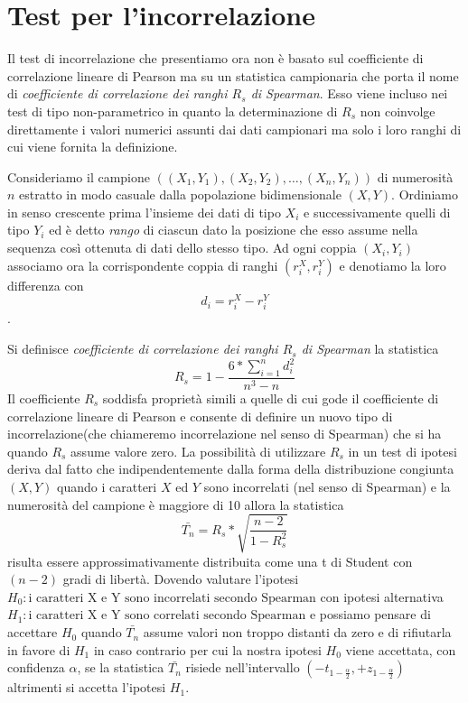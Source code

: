 \section{Test per l'incorrelazione}
Il test di incorrelazione che presentiamo ora non è basato sul coefficiente di correlazione lineare di Pearson 
ma su un statistica campionaria che porta il nome di \emph{coefficiente di correlazione dei ranghi $R_s$ di Spearman}.\newline
Esso viene incluso nei test di tipo non-parametrico in quanto la determinazione di $R_s$ non coinvolge direttamente
i valori numerici assunti dai dati campionari ma solo i loro ranghi di cui viene fornita la definizione.

Consideriamo il campione $((X_1, Y_1), (X_2, Y_2), \dots, (X_n, Y_n))$ di numerosità $n$ estratto in modo casuale
dalla popolazione bidimensionale $(X,Y)$.\newline
Ordiniamo in senso crescente prima l'insieme dei dati di tipo $X_i$ e successivamente quelli di tipo $Y_i$ ed è detto
\emph{rango} di ciascun dato la posizione che esso assume nella sequenza così ottenuta di dati dello stesso tipo.\newline
Ad ogni coppia $(X_i, Y_i)$ associamo ora la corrispondente coppia di ranghi $(r_i^X, r_i^Y)$ e denotiamo la loro differenza con
\[ d_i = r_i^X - r_i^Y \].

Si definisce \emph{coefficiente di correlazione dei ranghi $R_s$ di Spearman} la statistica 
\[ R_s = 1 - \frac{6 * \sum _{i = 1}^n d_i^2}{n^3 - n} \]
Il coefficiente $R_s$ soddisfa proprietà simili a quelle di cui gode il coefficiente di correlazione lineare di Pearson
e consente di definire un nuovo tipo di incorrelazione(che chiameremo incorrelazione nel senso di Spearman) 
che si ha quando $R_s$ assume valore zero.\newline
La possibilità di utilizzare $R_s$ in un test di ipotesi deriva dal fatto che indipendentemente dalla forma 
della distribuzione congiunta $(X,Y)$ quando i caratteri $X$ ed $Y$ sono incorrelati (nel senso di Spearman)
e la numerosità del campione è maggiore di 10 allora la statistica
\[ \bar{T_n} = R_s * \sqrt{\frac{n - 2}{1 - R_s^2}} \] 
risulta essere approssimativamente distribuita come una t di Student con $(n-2)$ gradi di libertà.\newline
Dovendo valutare l'ipotesi $H_0: \mbox{i caratteri X e Y sono incorrelati secondo Spearman}$ con ipotesi alternativa
$H_1: \mbox{i caratteri X e Y sono correlati secondo Spearman}$ e possiamo pensare di accettare $H_0$ quando $\bar{T_n}$
assume valori non troppo distanti da zero e di rifiutarla in favore di $H_1$ in caso contrario per cui la nostra ipotesi
$H_0$ viene accettata, con confidenza $\alpha$, se la statistica $\bar{T_n}$ risiede nell'intervallo 
$(-t_{1 - \frac{\alpha}{2}}, +z_{1 - \frac{\alpha}{2}})$ altrimenti si accetta l'ipotesi $H_1$.
